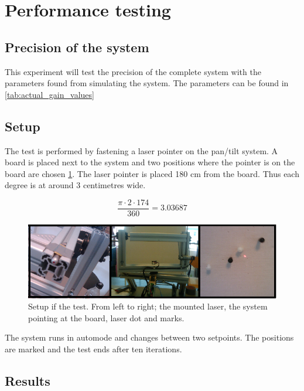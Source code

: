 \section{Performance testing}

\subsection{Precision of the system}\label{subsec:precisionofsystem}
This experiment will test the precision of the complete system with the
parameters found from simulating the system. The parameters can be found in
\ref{tab:actual_gain_values}

\subsection*{Setup}

The test is performed by fastening a laser pointer on the pan/tilt system. A
board is placed next to the system and two positions where the pointer is on the
board are chosen \ref{fig:systemtestsetup}. The laser pointer is placed 180 cm
from the board. Thus each degree is at around 3 centimetres wide.

\[ \frac{\pi \cdot 2 \cdot 174}{360} = 3.03687 \]


\begin{figure}[htb] \centering \includegraphics[width=\textwidth,trim=0 0 0
0]{graphics/overallsystemtest.png} %
	\caption{Setup if the test. From left to right; the mounted laser, the system pointing at the board, laser dot and marks.}
	\label{fig:systemtestsetup}			%
\end{figure}

The system runs in automode and changes between two setpoints. The positions
are marked and the test ends after ten iterations. 

\subsection*{Results}

